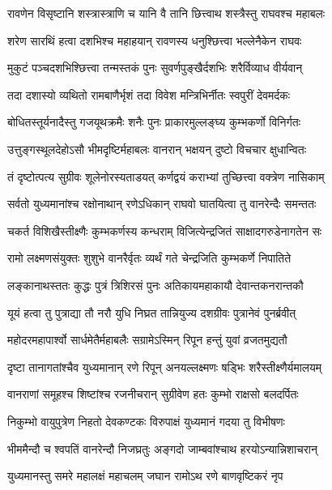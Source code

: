 \twolineshloka
{रावणेन विसृष्टानि शस्त्रास्त्राणि च यानि वै}
{तानि छित्त्वाथ शस्त्रैस्तु राघवश्च महाबलः} %

\twolineshloka
{शरेण सारथिं हत्वा दशभिश्च महाहयान्}
{रावणस्य धनुश्छित्त्वा भल्लेनैकेन राघवः} %

\twolineshloka
{मुकुटं पञ्चदशभिश्छित्त्वा तन्मस्तकं पुनः}
{सुवर्णपुङ्खैर्दशभिः शरैर्विव्याध वीर्यवान्} %

\twolineshloka
{तदा दशास्यो व्यथितो रामबाणैर्भृशं तदा}
{विवेश मन्त्रिभिर्नीतः स्वपुरीं देवमर्दकः} %

\twolineshloka
{बोधितस्तूर्यनादैस्तु गजयूथक्रमैः शनैः}
{पुनः प्राकारमुल्लङ्घ्य कुम्भकर्णो विनिर्गतः} %

\twolineshloka
{उत्तुङ्गस्थूलदेहोऽसौ भीमदृष्टिर्महाबलः}
{वानरान् भक्षयन् दुष्टो विचचार क्षुधान्वितः} %

\twolineshloka
{तं दृष्टोत्पत्य सुग्रीवः शूलेनोरस्यताडयत्}
{कर्णद्वयं कराभ्यां तुच्छित्त्वा वक्त्रेण नासिकाम्} %

\twolineshloka
{सर्वतो युध्यमानांश्च रक्षोनाथान् रणेऽधिकान्}
{राघवो घातयित्वा तु वानरेन्दैः समन्ततः} %

\twolineshloka
{चकर्त विशिखैस्तीक्ष्णैः कुम्भकर्णस्य कन्धराम्}
{विजित्येन्द्रजितं साक्षादगरुडेनागतेन सः} %

\twolineshloka
{रामो लक्ष्मणसंयुक्तः शुशुभे वानरैर्वृतः}
{व्यर्थं गते चेन्द्रजिति कुम्भकर्णे निपातिते} %

\twolineshloka
{लङ्कानाथस्ततः कुद्धः पुत्रं त्रिशिरसं पुनः}
{अतिकायमहाकायौ देवान्तकनरान्तकौ} %

\twolineshloka
{यूयं हत्वा तु पुत्राद्या तौ नरौ युधि निघ्रत}
{तान्नियुज्य दशग्रीवः पुत्रानेवं पुनर्ब्रवीत्} %

\twolineshloka
{महोदरमहापार्श्वो सार्धमेतैर्महाबलैः}
{सग्रामेऽस्मिन् रिपून हन्तुं युवां व्रजतमुद्यतौ} %

\twolineshloka
{दृष्टा तानागतांश्चैव युध्यमानान् रणे रिपून्}
{अनयल्लक्ष्मणः षड्भिः शरैस्तीक्ष्णैर्यमालयम्} %

\twolineshloka
{वानराणां समूहश्च शिष्टांश्च रजनीचरान्}
{सुग्रीवेण हतः कुम्भो राक्षसो बलदर्पितः} %

\twolineshloka
{निकुम्भो वायुपुत्रेण निहतो देवकण्टकः}
{विरुपाक्षं युध्यमानं गदया तु विभीषणः} %

\twolineshloka
{भीममैन्दौ च श्वपतिं वानरेन्दौ निजघ्रतुः}
{अङ्गदो जाम्बवांश्चाथ हरयोऽन्यान्निशाचरान्} %

\twolineshloka
{युध्यमानस्तु समरे महालक्षं महाचलम्}
{जघान रामोऽथ रणे बाणवृष्टिकरं नृप} %

